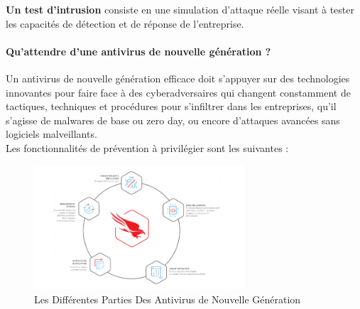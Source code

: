 \textbf{Un test d’intrusion} consiste en une simulation d’attaque réelle visant à tester les capacités de détection et de réponse de l’entreprise.

\paragraph{Qu’attendre d’une antivirus de nouvelle génération ?}


Un antivirus de nouvelle génération efficace doit s’appuyer sur des technologies innovantes pour faire face à des cyberadversaires qui changent constamment de tactiques, techniques et procédures pour s’infiltrer dans les entreprises, qu’il s’agisse de malwares de base ou zero day, ou encore d’attaques avancées sans logiciels malveillants.\\
 Les fonctionnalités de prévention à privilégier sont les suivantes :

\begin{figure}[h]
	\begin{center}
	\includegraphics[width=0.7\textwidth]{PhotoMemoire/newgenerationanti.png}
	\caption{Les Différentes Parties Des Antivirus de Nouvelle Génération  }
	\end{center}
\end{figure}

